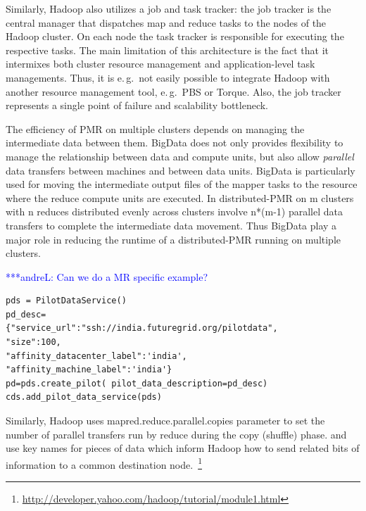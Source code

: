 \documentclass{acm_proc_article-sp}
\newcommand{\alnote}[1]{ {\textcolor{blue} { ***andreL: #1 }}}
\newcommand{\alnote}[1]{}
\newcommand{\pilotmapreduce}{Pilot-MapReduce\xspace}
\begin{document}
Similarly, Hadoop also utilizes a job and task tracker: the job tracker is the
central manager that dispatches map and reduce tasks to the nodes of the
Hadoop cluster. On each node the task tracker is responsible for executing the
respective tasks. The main limitation of this architecture is the fact that it
intermixes both cluster resource management and application-level task
managements. Thus, it is e.\,g.\ not easily possible to integrate Hadoop with
another resource management tool, e.\,g.\ PBS or Torque. Also, the job tracker
represents a single point of failure and scalability bottleneck.


The efficiency of PMR on multiple clusters depends on managing the intermediate data 
between them. BigData does not only provides flexibility to manage the
relationship between data and compute units, but also allow {\it parallel} data transfers
between machines and between data units. BigData is particularly used for moving the
intermediate output files of the mapper tasks to the resource where the reduce compute
units are executed. In distributed-PMR on m clusters with n reduces distributed
evenly across clusters involve n*(m-1) parallel data transfers to complete the intermediate
data movement. Thus BigData play a major role in reducing the runtime of a distributed-PMR running
on multiple clusters.

\alnote{Can we do a MR specific example?}

\lstset{
language=Python,
frame=single,
captionpos=b,
stringstyle=\ttfamily,
basicstyle=\scriptsize\ttfamily
}
\noindent\begin{minipage}{0.47 \textwidth}
\begin{lstlisting}[caption={\textbf{Pilot Data Creation:} Instantiation of a Pilot Data using Pilot Data Description}, label={lst:pds_creation}]
pds = PilotDataService()
pd_desc=
{"service_url":"ssh://india.futuregrid.org/pilotdata",
"size":100,
"affinity_datacenter_label":'india',
"affinity_machine_label":'india'}
pd=pds.create_pilot( pilot_data_description=pd_desc)
cds.add_pilot_data_service(pds)
\end{lstlisting}
\end{minipage}

Similarly, Hadoop uses mapred.reduce.parallel.copies parameter to set
the number of parallel transfers run by reduce during the
copy (shuffle) phase.  and use key names for pieces of data which
inform Hadoop how to send related bits of information to a common
destination
node.~\footnote{\url{http://developer.yahoo.com/hadoop/tutorial/module1.html}}
\end{document}
